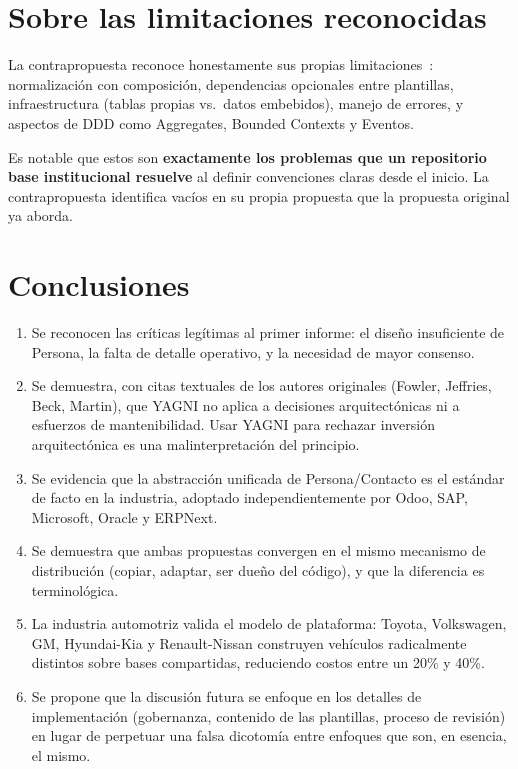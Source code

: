 \documentclass[conference]{IEEEtran}
\begin{document}
\section{Sobre las limitaciones reconocidas}

La contrapropuesta reconoce honestamente sus propias
limitaciones~\cite{araoz2026}: normalizaci\'on con composici\'on,
dependencias opcionales entre plantillas, infraestructura
(tablas propias vs.\ datos embebidos), manejo de errores, y
aspectos de DDD como Aggregates, Bounded Contexts y Eventos.

Es notable que estos son \textbf{exactamente los problemas que un
repositorio base institucional resuelve} al definir convenciones
claras desde el inicio. La contrapropuesta identifica vac\'ios
en su propia propuesta que la propuesta original ya aborda.

\section{Conclusiones}

\begin{enumerate}
  \item Se reconocen las cr\'iticas leg\'itimas al primer
    informe: el dise\~no insuficiente de Persona, la falta de
    detalle operativo, y la necesidad de mayor consenso.

  \item Se demuestra, con citas textuales de los autores
    originales (Fowler, Jeffries, Beck, Martin), que YAGNI no
    aplica a decisiones arquitect\'onicas ni a esfuerzos de
    mantenibilidad. Usar YAGNI para rechazar inversi\'on
    arquitect\'onica es una malinterpretaci\'on del principio.

  \item Se evidencia que la abstracci\'on unificada de
    Persona/Contacto es el est\'andar de facto en la industria,
    adoptado independientemente por Odoo, SAP, Microsoft, Oracle
    y ERPNext.

  \item Se demuestra que ambas propuestas convergen en el mismo
    mecanismo de distribuci\'on (copiar, adaptar, ser due\~no del
    c\'odigo), y que la diferencia es terminol\'ogica.

  \item La industria automotriz valida el modelo de plataforma:
    Toyota, Volkswagen, GM, Hyundai-Kia y Renault-Nissan
    construyen veh\'iculos radicalmente distintos sobre bases
    compartidas, reduciendo costos entre un 20\% y 40\%.

  \item Se propone que la discusi\'on futura se enfoque en los
    detalles de implementaci\'on (gobernanza, contenido de las
    plantillas, proceso de revisi\'on) en lugar de perpetuar una
    falsa dicotom\'ia entre enfoques que son, en esencia, el
    mismo.
\end{enumerate}
\end{document}
